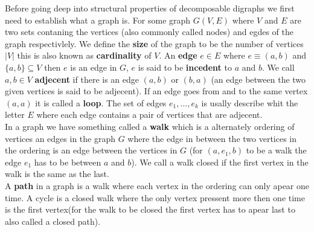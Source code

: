 Before going deep into structural properties of decomposable digraphs we first need to establish what a graph is.
For some graph $G(V,E)$ where $V$ and $E$ are two sets contaning the vertices (also commonly called nodes) and egdes of the graph respectivlely.
We define the \textbf{size} of the graph to be the number of vertices $|V|$ this is also known as \textbf{cardinality} of $V$.
An \textbf{edge} $e \in E$ where $e \equiv (a, b)$ and $\{ a, b \} \subseteq V$ then $e$ is an edge in $G$, $e$ is said to be \textbf{incedent} to $a$ and $b$. 
We call $a,b \in V$ \textbf{adjecent} if there is an edge $(a,b)$ or $(b,a)$ (an edge between the two given vertices is said to be adjecent).
If an edge goes from and to the same vertex $(a,a)$ it is called a \textbf{loop}.
The set of edges $e_1, \dots, e_k$ is usally describe whit the letter $E$ where each edge contains a pair of vertices that are adjecent. \\
In a graph we have something called a \textbf{walk} which is a alternately ordering of vertices an edges in the graph $G$ where the edge in between the two vertices in the ordering is an edge between the vertices in $G$ (for $(a,e_1,b)$ to be a walk the edge $e_1$ has to be between $a$ and $b$).
We call a walk closed if the first vertex in the walk is the same as the last.\\
A \textbf{path} in a graph is a walk where each vertex in the ordering can only apear one time. A cycle is a closed walk where the only vertex pressent more then one time is the first vertex(for the walk to be closed the first vertex has to apear last to also called a closed path).

